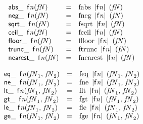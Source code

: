 $$
\begin{array}{@{}lcl@{}l@{}}
{{\mathsf{abs}}{\mathsf{\_}}~\,{\mathsf{f}}{{\mathit{n}}}}{({\mathit{fN}})} &=& {\mathrm{fabs}}~\,{|{\mathsf{f}}{{\mathit{n}}}|}~\,({\mathit{fN}}) &  \\
{{\mathsf{neg}}{\mathsf{\_}}~\,{\mathsf{f}}{{\mathit{n}}}}{({\mathit{fN}})} &=& {\mathrm{fneg}}~\,{|{\mathsf{f}}{{\mathit{n}}}|}~\,({\mathit{fN}}) &  \\
{{\mathsf{sqrt}}{\mathsf{\_}}~\,{\mathsf{f}}{{\mathit{n}}}}{({\mathit{fN}})} &=& {\mathrm{fsqrt}}~\,{|{\mathsf{f}}{{\mathit{n}}}|}~\,({\mathit{fN}}) &  \\
{{\mathsf{ceil}}{\mathsf{\_}}~\,{\mathsf{f}}{{\mathit{n}}}}{({\mathit{fN}})} &=& {\mathrm{fceil}}~\,{|{\mathsf{f}}{{\mathit{n}}}|}~\,({\mathit{fN}}) &  \\
{{\mathsf{floor}}{\mathsf{\_}}~\,{\mathsf{f}}{{\mathit{n}}}}{({\mathit{fN}})} &=& {\mathrm{ffloor}}~\,{|{\mathsf{f}}{{\mathit{n}}}|}~\,({\mathit{fN}}) &  \\
{{\mathsf{trunc}}{\mathsf{\_}}~\,{\mathsf{f}}{{\mathit{n}}}}{({\mathit{fN}})} &=& {\mathrm{ftrunc}}~\,{|{\mathsf{f}}{{\mathit{n}}}|}~\,({\mathit{fN}}) &  \\
{{\mathsf{nearest}}{\mathsf{\_}}~\,{\mathsf{f}}{{\mathit{n}}}}{({\mathit{fN}})} &=& {\mathrm{fnearest}}~\,{|{\mathsf{f}}{{\mathit{n}}}|}~\,({\mathit{fN}}) &  \\
\end{array}
$$

$$
\begin{array}{@{}lcl@{}l@{}}
{{\mathsf{eq}}{\mathsf{\_}}~\,{\mathsf{f}}{{\mathit{n}}}}{({\mathit{fN}}_{{1}},\, {\mathit{fN}}_{{2}})} &=& {\mathrm{feq}}~\,{|{\mathsf{f}}{{\mathit{n}}}|}~\,({\mathit{fN}}_{{1}},\, {\mathit{fN}}_{{2}}) &  \\
{{\mathsf{ne}}{\mathsf{\_}}~\,{\mathsf{f}}{{\mathit{n}}}}{({\mathit{fN}}_{{1}},\, {\mathit{fN}}_{{2}})} &=& {\mathrm{fne}}~\,{|{\mathsf{f}}{{\mathit{n}}}|}~\,({\mathit{fN}}_{{1}},\, {\mathit{fN}}_{{2}}) &  \\
{{\mathsf{lt}}{\mathsf{\_}}~\,{\mathsf{f}}{{\mathit{n}}}}{({\mathit{fN}}_{{1}},\, {\mathit{fN}}_{{2}})} &=& {\mathrm{flt}}~\,{|{\mathsf{f}}{{\mathit{n}}}|}~\,({\mathit{fN}}_{{1}},\, {\mathit{fN}}_{{2}}) &  \\
{{\mathsf{gt}}{\mathsf{\_}}~\,{\mathsf{f}}{{\mathit{n}}}}{({\mathit{fN}}_{{1}},\, {\mathit{fN}}_{{2}})} &=& {\mathrm{fgt}}~\,{|{\mathsf{f}}{{\mathit{n}}}|}~\,({\mathit{fN}}_{{1}},\, {\mathit{fN}}_{{2}}) &  \\
{{\mathsf{le}}{\mathsf{\_}}~\,{\mathsf{f}}{{\mathit{n}}}}{({\mathit{fN}}_{{1}},\, {\mathit{fN}}_{{2}})} &=& {\mathrm{fle}}~\,{|{\mathsf{f}}{{\mathit{n}}}|}~\,({\mathit{fN}}_{{1}},\, {\mathit{fN}}_{{2}}) &  \\
{{\mathsf{ge}}{\mathsf{\_}}~\,{\mathsf{f}}{{\mathit{n}}}}{({\mathit{fN}}_{{1}},\, {\mathit{fN}}_{{2}})} &=& {\mathrm{fge}}~\,{|{\mathsf{f}}{{\mathit{n}}}|}~\,({\mathit{fN}}_{{1}},\, {\mathit{fN}}_{{2}}) &  \\
\end{array}
$$

